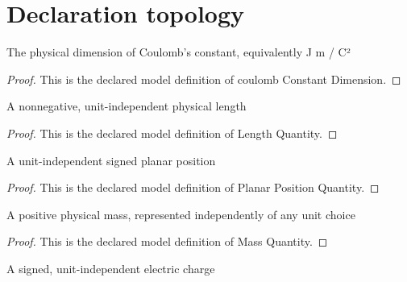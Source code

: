 \section{Declaration topology}
\begin{definition}
  \label{def:physics:phyx-mini-0853:phyxminiproblems-problemphyxmini0853-coulombconstantdimension}
  The physical dimension of Coulomb's constant, equivalently J m / C²
\end{definition}
\begin{proof}
  This is the declared model definition of coulomb Constant Dimension.
\end{proof}
\begin{definition}
  \label{def:physics:phyx-mini-0853:phyxminiproblems-problemphyxmini0853-lengthquantity}
  A nonnegative, unit-independent physical length
\end{definition}
\begin{proof}
  This is the declared model definition of Length Quantity.
\end{proof}
\begin{definition}
  \label{def:physics:phyx-mini-0853:phyxminiproblems-problemphyxmini0853-planarpositionquantity}
  A unit-independent signed planar position
\end{definition}
\begin{proof}
  This is the declared model definition of Planar Position Quantity.
\end{proof}
\begin{definition}
  \label{def:physics:phyx-mini-0853:phyxminiproblems-problemphyxmini0853-massquantity}
  A positive physical mass, represented independently of any unit choice
\end{definition}
\begin{proof}
  This is the declared model definition of Mass Quantity.
\end{proof}
\begin{definition}
  \label{def:physics:phyx-mini-0853:phyxminiproblems-problemphyxmini0853-signedchargequantity}
  A signed, unit-independent electric charge
\end{definition}

